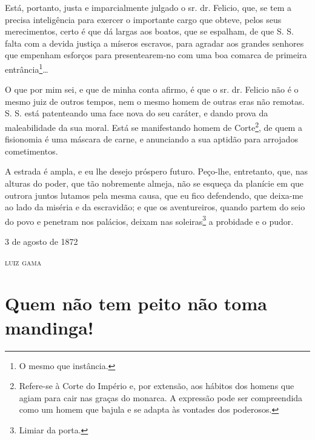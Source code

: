 Está, portanto, justa e imparcialmente julgado o sr. dr. Felicio, que,
se tem a precisa inteligência para exercer o importante cargo que
obteve, pelos seus merecimentos, certo é que dá largas aos boatos, que
se espalham, de que S. S. falta com a devida justiça a míseros escravos,
para agradar aos grandes senhores que empenham esforços para
presentearem-no com uma boa comarca de primeira entrância\footnote{ O
  mesmo que instância.}\ldots{}

O que por mim sei, e que de minha conta afirmo, é que o sr. dr. Felicio
não é o mesmo juiz de outros tempos, nem o mesmo homem de outras eras
não remotas. S. S. está patenteando uma face nova do seu caráter, e
dando prova da maleabilidade da sua moral. Está se manifestando homem de
Corte\footnote{ Refere-se à Corte do Império e, por extensão, aos
  hábitos dos homens que agiam para cair nas graças do monarca. A
  expressão pode ser compreendida como um homem que bajula e se adapta
  às vontades dos poderosos.}, de quem a fisionomia é uma máscara de
carne, e anunciando a sua aptidão para arrojados cometimentos.

A estrada é ampla, e eu lhe desejo próspero futuro. Peço-lhe,
entretanto, que, nas alturas do poder, que tão nobremente almeja, não se
esqueça da planície em que outrora juntos lutamos pela mesma causa, que
eu fico defendendo, que deixa-me ao lado da miséria e da escravidão; e
que os aventureiros, quando partem do seio do povo e penetram nos
palácios, deixam nas soleiras\footnote{ Limiar da porta.} a probidade e
o pudor.

\begin{flushright}
3 de agosto de 1872

\textsc{luiz gama}
\end{flushright}

\part{Quem não tem peito não toma mandinga!}

